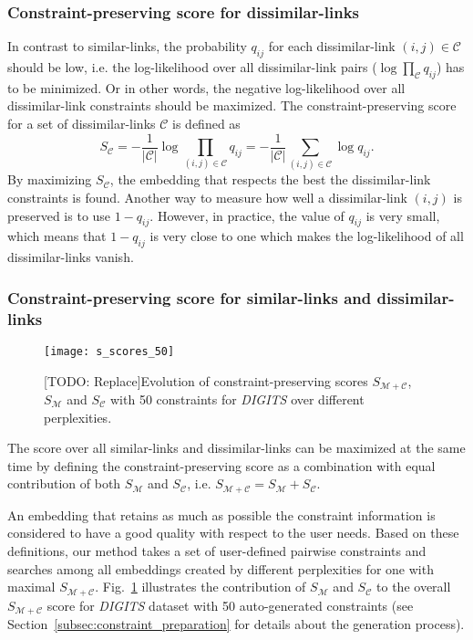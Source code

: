 \subsubsection*{Constraint-preserving score for dissimilar-links}
In contrast to similar-links, the probability $q_{ij}$ for each dissimilar-link $(i,j) \in \mathcal{C}$ should be low, i.e. the log-likelihood over all dissimilar-link pairs ($\log \prod_{\mathcal{C}} q_{ij}$) has to be minimized. Or in other words, the negative log-likelihood over all dissimilar-link constraints should be maximized. The constraint-preserving score for a set of dissimilar-links $\mathcal{C}$ is defined as
\begin{equation}
S_{\mathcal{C}} = -\frac{1}{|\mathcal{C}|} \log \prod_{(i,j) \in \mathcal{C}} q_{ij}
                = -\frac{1}{|\mathcal{C}|} \sum_{(i,j) \in \mathcal{C}} \log q_{ij}.
\end{equation}
By maximizing $S_{\mathcal{C}}$, the embedding that respects the best the dissimilar-link constraints is found.
Another way to measure how well a dissimilar-link $(i,j)$ is preserved is to use $1 - q_{ij}$. However, in practice, the value of $q_{ij}$ is very small, which means that $1 - q_{ij}$ is very close to one which makes the log-likelihood of all dissimilar-links vanish.

\subsubsection*{Constraint-preserving score for similar-links and dissimilar-links}

\begin{figure}
    \centering
    \texttt{[image: s\_scores\_50]}
    \caption{[TODO: Replace]Evolution of constraint-preserving scores $S_{\mathcal{M}+\mathcal{C}}$, $S_{\mathcal{M}}$ and $S_{\mathcal{C}}$ with 50 constraints for \emph{DIGITS} over different perplexities.}
    \label{fig:s_scores_mnist}
\end{figure}

The score over all similar-links and dissimilar-links can be maximized at the same time by defining the constraint-preserving score as a combination with equal contribution of both $S_{\mathcal{M}}$ and $S_{\mathcal{C}}$, i.e. $S_{\mathcal{M}+\mathcal{C}} = S_{\mathcal{M}} + S_{\mathcal{C}}$.

An embedding that retains as much as possible the constraint information is considered to have a good quality with respect to the user needs.
Based on these definitions, our method takes a set of user-defined pairwise constraints and searches among all embeddings created by different perplexities for one with maximal $S_{\mathcal{M}+\mathcal{C}}$.
Fig.~\ref{fig:s_scores_mnist} illustrates the contribution of $S_{\mathcal{M}}$ and $S_{\mathcal{C}}$ to the overall $S_{\mathcal{M}+\mathcal{C}}$ score for \emph{DIGITS} dataset with 50 auto-generated constraints (see Section~\ref{subsec:constraint_preparation} for details about the generation process).


